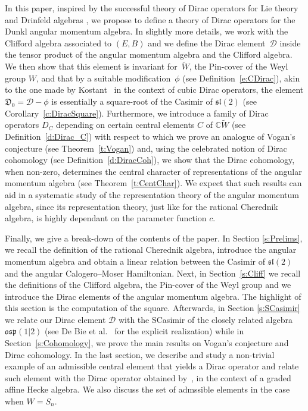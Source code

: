 \documentclass[pdftex]{sigma}
\numberwithin{equation}{section}
\newcommand{\bbc}{\mathbb{C}}
\begin{document}
In this paper, inspired by the successful theory of Dirac operators for Lie theory \cite{AS77,HP02,K03,P72,V97}
and Drinfeld algebras \cite{BCT12,C20,C16,CDM18, COT14}, we propose to define a theory of Dirac operators for the Dunkl angular momentum algebra. In slightly more details, we work with the Clifford algebra associated to $(E,B)$ and we define the Dirac element~$\mathcal{D}$ inside the tensor product of the angular momentum algebra and the Clifford algebra. We then show that this element is invariant for~$\tilde{W}$, the Pin-cover of the Weyl group $W$, and that by a suitable modification~$\phi$ (see Definition~\ref{e:CDirac}), akin to the one made by Kostant~\cite{K03} in the context of cubic Dirac operators, the element $\mathfrak{D}_0 = \mathcal{D} - \phi$ is essentially a square-root of the Casimir of $\mathfrak{sl}(2)$ (see Corollary~\ref{c:DiracSquare}). Furthermore, we introduce a family of Dirac operators $D_C$ depending on certain central elements $C$ of $\bbc \tilde W$ (see Definition~\ref{d:Dirac_C}) with respect to which we prove an analogue of Vogan's conjecture (see Theorem~\ref{t:Vogan}) and, using the celebrated notion of Dirac cohomology (see Definition~\ref{d:DiracCoh}), we show that the Dirac cohomology, when non-zero, determines the central character of representations of the angular momentum algebra (see Theorem~\ref{t:CentChar}). We expect that such results can aid in a systematic study of the representation theory of the angular momentum algebra, since its representation theory, just like for the rational Cherednik algebra, is highly dependant on the parameter function $c$.

Finally, we give a break-down of the contents of the paper. In Section \ref{s:Prelims}, we recall the definition of the rational Cherednik algebra, introduce the angular momentum algebra and obtain a linear relation between the Casimir of $\mathfrak{sl}(2)$ and the angular Calogero--Moser Hamiltonian. Next, in Section~\ref{s:Cliff} we recall the definitions of the Clifford algebra, the Pin-cover of the Weyl group and we introduce the Dirac elements of the angular momentum algebra. The highlight of this section is the computation of the square. Afterwards, in Section \ref{s:SCasimir} we relate our Dirac element $\mathcal{D}$ with the SCasimir of the closely related algebra $\mathfrak{osp}(1|2)$ (see De Bie et al.~\cite{DOV18a,DOV18b} for the explicit realization) while in Section~\ref{s:Cohomology}, we prove the main results on Vogan's conjecture and Dirac cohomology. In the last section, we describe and study a non-trivial example of an admissible central element that yields a Dirac operator and relate such element with the Dirac operator obtained by~\cite{BCT12}, in the context of a graded affine Hecke algebra. We also discuss the set of admssible elements in the case when $W=S_n$.
\end{document}
